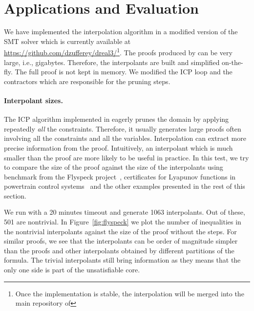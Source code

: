 \section{Applications and Evaluation}
\label{sec:eval}

We have implemented the interpolation algorithm in a modified version of the \dReal SMT solver which is currently available at \url{https://github.com/dzufferey/dreal3/}\footnote{Once the implementation is stable, the interpolation will be merged into the main repository of \dReal}.
The proofs produced by \dReal can be very large, i.e., gigabytes.
Therefore, the interpolants are built and simplified on-the-fly.
The full proof is not kept in memory.
We modified the ICP loop and the contractors which are responsible for the pruning steps.

\paragraph{Interpolant sizes.}
The ICP algorithm implemented in \dReal eagerly prunes the domain by applying repeatedly \emph{all} the constraints.
Therefore, it usually generates large proofs often involving all the constraints and all the variables.
Interpolation can extract more precise information from the proof.
Intuitively, an interpolant which is much smaller than the proof are more likely to be useful in practice.
In this test, we try to compare the size of the proof against the size of the interpolants using benchmark from the Flyspeck project~\cite{2015arXiv150102155H}, certificates for Lyapunov functions in powertrain control systems~\cite{DBLP:conf/hybrid/KapinskiDSA14} and the other examples presented in the rest of this section.


We run \dReal with a 20 minutes timeout and generate 1063 interpolants.
Out of these, 501 are nontrivial.
In Figure~\ref{fig:flyspeck} we plot the number of inequalities in the nontrivial interpolants against the size of the proof without the \weaken steps.
For similar proofs, we see that the interpolants can be order of magnitude simpler than the proofs and other interpolants obtained by different partitions of the formula.
The trivial interpolants still bring information as they means that the only one side is part of the unsatisfiable core.


